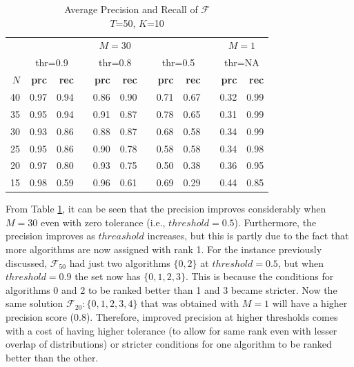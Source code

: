 \documentclass[conference]{IEEEtran}
\begin{document}
\begin{table}[h!]
	\begin{center}
		\renewcommand{\arraystretch}{1.2}
		\begin{tabular}{@{}r rr c rr c rr c rr@{}}
			\toprule
			& \multicolumn{8}{c}{$M=30$} & & \multicolumn{2}{c}{$M=1$} \\
			\cmidrule{2-9} \cmidrule{11-12}
			& \multicolumn{2}{c}{thr=0.9} & & \multicolumn{2}{c}{thr=0.8} & & \multicolumn{2}{c}{thr=0.5} & & \multicolumn{2}{c}{thr=NA} \\
			\cmidrule{2-3} \cmidrule{5-6} \cmidrule{8-9} \cmidrule{11-12}
			{$N$} & \textbf{prc} & \textbf{rec} && \textbf{prc} & \textbf{rec} && \textbf{prc} & \textbf{rec} && \textbf{prc} & \textbf{rec} \\
			\midrule
			{40} & 0.97  & 0.94  && 0.86  & 0.90  && 0.71  & 0.67 && 0.32 & 0.99 \\
			{35} & 0.95  & 0.94  && 0.91  & 0.87  && 0.78  & 0.65 && 0.31 & 0.99 \\
			{30} & 0.93  & 0.86  && 0.88  & 0.87  && 0.68  & 0.58 && 0.34 & 0.99 \\
			{25} & 0.95  & 0.86  && 0.90  & 0.78  && 0.58  & 0.58 && 0.34 & 0.98 \\
			{20} & 0.97  & 0.80  && 0.93  & 0.75  && 0.50  & 0.38 && 0.36 & 0.95 \\
			{15} & 0.98  & 0.59  && 0.96  & 0.61  && 0.69  & 0.29 && 0.44 & 0.85 \\
			\bottomrule
		\end{tabular}
		\caption{Average Precision and Recall of $\mathcal{F}$ \\$T$=50, $K$=10}
		\label{tab:3}
	\end{center}
\end{table}
 From Table \ref{tab:3}, it can be seen that the precision improves considerably when $M=30$ even with zero tolerance (i.e., $threshold = 0.5$). Furthermore, the precision improves as $threashold$ increases, but this is partly due to the fact that more algorithms are now assigned with rank 1. For the instance previously discussed, $\mathcal{F}_{50}$ had just two algorithms $\{0,2\}$ at $threshold = 0.5$, but when $threshold = 0.9$ the set now has $ \{0,1,2,3\}$. This is because the conditions for algorithms 0 and 2 to be ranked better than 1 and 3 became stricter. Now the same solution $\mathcal{F}_{20} : \{0,1,2,3,4\}$ that was obtained with $M=1$ will have a higher precision score (0.8). Therefore, improved precision at higher thresholds comes with a cost of having higher tolerance (to allow for same rank even with lesser overlap of distributions) or stricter conditions for one algorithm to be ranked better than the other. 
 
\end{document}

